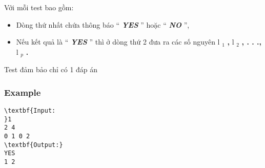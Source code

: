 Với mỗi test bao gồm:
\begin{itemize}
	\item Dòng thứ nhất chứa thông báo “ \textbf{\emph{ YES }} ” hoặc “ \textbf{\emph{ NO }} ”,
	\item Nếu kết quả là “ \textbf{\emph{ YES }} ” thì ở dòng thứ 2 đưa ra các số nguyên l \textbf{$_ 1 $}\textbf{ , } l \textbf{$_ 2 $}\textbf{ , . . ., } l \emph{$_ p $}\textbf{ . }
\end{itemize}

Test đảm bảo chỉ có 1 đáp án

\subsubsection{Example}
\begin{verbatim}
\textbf{Input:
}1
2 4
0 1 0 2
\textbf{Output:}
YES
1 2


\end{verbatim}